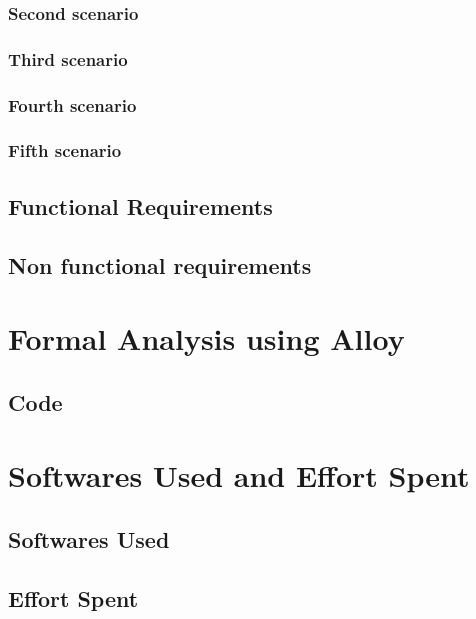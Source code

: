 \documentclass[12pt]{article}
\begin{document}
	\subsubsection{Second scenario}
	
	\FloatBarrier
	\clearpage
	\subsubsection{Third scenario}
	
	\FloatBarrier
	\clearpage
	\subsubsection{Fourth scenario}
	
	\FloatBarrier
	\clearpage
	\subsubsection{Fifth scenario}
	
	\FloatBarrier
	\clearpage
	\subsection{Functional Requirements}
	
	\subsection{Non functional requirements}
	

	\clearpage
	\section{Formal Analysis using Alloy}
	
	\subsection{Code}
	
	
	\clearpage
	\section{Softwares Used and Effort Spent}
	\subsection{Softwares Used}
	
	\subsection{Effort Spent}
	
\end{document}
